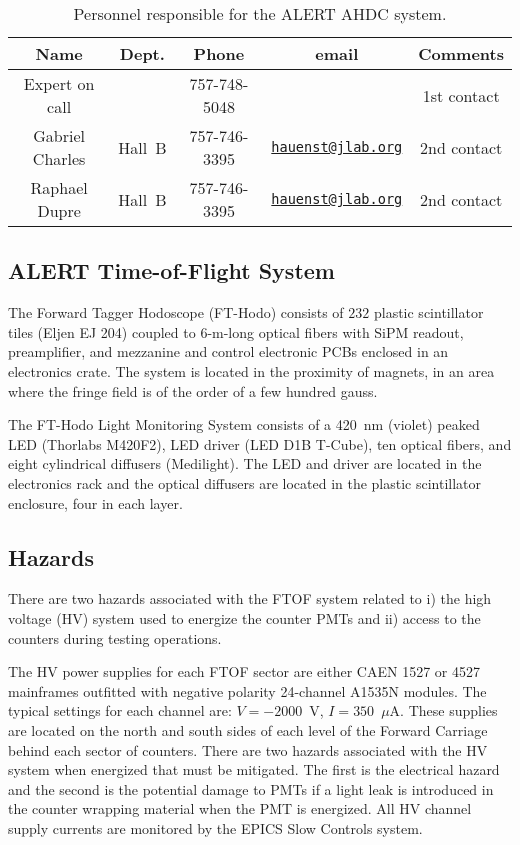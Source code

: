 \begin{table}[!htb]
\centering
\begin{tabular}{|c|c|c|c|c|} \hline
Name            & Dept.  & Phone        & email&Comments \\ \hline
Expert on call  &        & 757-748-5048 &       & 1st contact \\ \hline
Gabriel Charles & Hall~B & 757-746-3395 & \href{mailto:hauenst@jlab.org}{\nolinkurl{hauenst@jlab.org}} &  2nd contact\\ Raphael Dupre   & Hall~B & 757-746-3395 & \href{mailto:hauenst@jlab.org}{\nolinkurl{hauenst@jlab.org}} &  2nd contact\\ \hline
 \end{tabular}
\caption{Personnel responsible for the ALERT AHDC system.} 
\label{tb:ahdc}
\end{table}

\subsection{ALERT Time-of-Flight System}

The Forward Tagger Hodoscope (FT-Hodo) consists of $232$ plastic scintillator tiles (Eljen 
EJ 204) coupled to 6-m-long optical fibers with SiPM readout, preamplifier, and mezzanine 
and control electronic PCBs enclosed in an electronics crate. The system is located in the 
proximity of magnets, in an area where the fringe field is of the order of a few hundred gauss.

The FT-Hodo Light Monitoring System consists of a 420~nm (violet) peaked LED (Thorlabs M420F2), 
LED driver (LED D1B T-Cube), ten optical fibers, and eight cylindrical diffusers (Medilight). 
The LED and driver are located in the electronics rack and the optical diffusers are located 
in the plastic scintillator enclosure, four in each layer.

\subsection{Hazards} 

There are two hazards associated with the FTOF system related to i) the high voltage (HV)
system used to energize the counter PMTs and ii) access to the counters during testing 
operations.

The HV power supplies for each FTOF sector are either CAEN 1527 or 4527 mainframes outfitted
with negative polarity 24-channel A1535N modules. The typical settings
for each channel are: $V=-2000$~V, $I=350$~$\mu$A. These supplies are located on the north 
and south sides of each level of the Forward Carriage behind each sector of counters. There 
are two hazards associated with the HV system when energized that must be mitigated. The 
first is the electrical hazard and the second is the potential damage to PMTs if a light 
leak is introduced in the counter wrapping material when the PMT is energized. All HV channel
supply currents are monitored by the EPICS Slow Controls system.

